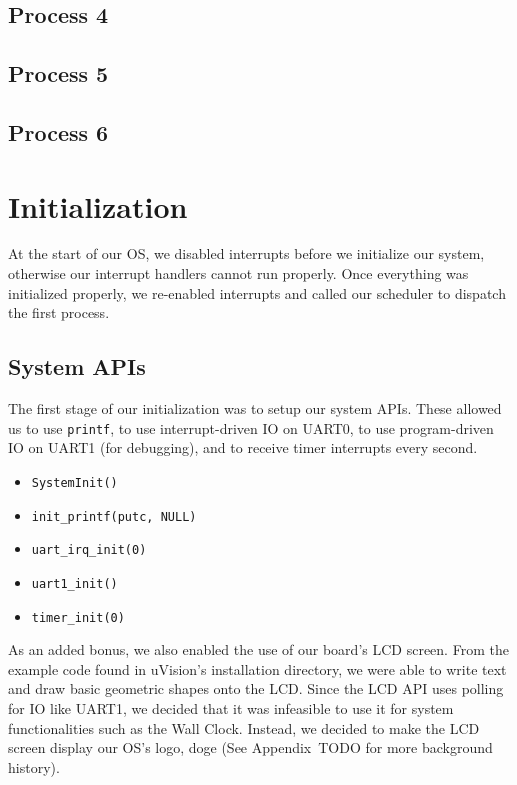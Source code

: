 \documentclass[se]{uw-wkrpt}
\begin{document}
\subsection{Process 4}

\subsection{Process 5}

\subsection{Process 6}

\section{Initialization}\label{sec:init}

At the start of our OS, we disabled interrupts before we initialize our system, otherwise our interrupt handlers cannot run properly. Once everything was initialized properly, we re-enabled interrupts and called our scheduler to dispatch the first process.

\subsection{System APIs}
The first stage of our initialization was to setup our system APIs. These allowed us to use \texttt{printf}, to use interrupt-driven IO on UART0, to use program-driven IO on UART1 (for debugging), and to receive timer interrupts every second.

\begin{itemize}
	\item \texttt{SystemInit()}
	\item \texttt{init\_printf(putc, NULL)}	
	\item \texttt{uart\_irq\_init(0)}
	\item \texttt{uart1\_init()}
	\item \texttt{timer\_init(0)}
\end{itemize}

As an added bonus, we also enabled the use of our board's LCD screen. From the example code found in uVision's installation directory, we were able to write text and draw basic geometric shapes onto the LCD. Since the LCD API uses polling for IO like UART1, we decided that it was infeasible to use it for system functionalities such as the Wall Clock. Instead, we decided to make the LCD screen display our OS's logo, doge (See Appendix~TODO for more background history).
\end{document}
